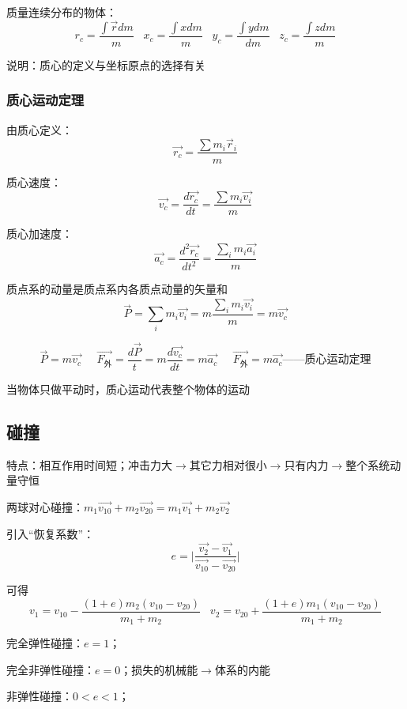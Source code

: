 \documentclass[UTF8]{article}
\begin{document}
    质量连续分布的物体：\[r_c = \frac{\int\vec{r}dm}{m}\;\;\;x_c = \frac{\int xdm}{m}\;\;\;y_c = \frac{\int ydm}{dm}\;\;\;z_c = \frac{\int zdm}{m}\]

    说明：质心的定义与坐标原点的选择有关

\subsubsection{质心运动定理}

    由质心定义：\[\vec{r_c} = \frac{\sum m_i\vec r_i}{m}\]
    
    质心速度：\[\vec{v_c} = \frac{d\vec{r_c}}{dt} = \frac{\sum m_i\vec{v_i}}{m}\]

    质心加速度：\[\vec{a_c} = \frac{d^2\vec{r_c}}{dt^2} = \frac{\sum_i m_i\vec{a_i}}{m}\]

    质点系的动量是质点系内各质点动量的矢量和
    \[\vec{P} = \sum_i m_i\vec{v_i} = m\frac{\sum_i m_i\vec{v_i}}{m} = m\vec{v_c}\]

    \[\vec{P} = m\vec{v_c}\;\;\;\;\;\vec{F_{\mbox{外}}} = \frac{d\vec{P}}{t} = m\frac{d\vec{v_c}}{dt} = m\vec{a_c}\;\;\;\;\;\vec{F_{\mbox{外}}} = m\vec{a_c}\mbox{——质心运动定理}\]

    当物体只做平动时，质心运动代表整个物体的运动

\subsection{碰撞}

    特点：相互作用时间短；冲击力大$\rightarrow$其它力相对很小$\rightarrow$只有内力$\rightarrow$整个系统动量守恒

    两球对心碰撞：$m_1\vec{v_{10}} + m_2\vec{v_{20}} = m_1\vec{v_1} + m_2\vec{v_2}$

    引入“恢复系数”：\[e = \lvert \frac{\vec{v_2} - \vec{v_1}}{\vec{v_{10}} - \vec{v_{20}}} \rvert\]

    可得\[v_1 = v_{10} - \frac{(1+e)m_2(v_{10} - v_{20})}{m_1 + m_2}\;\;\;v_2 = v_{20} + \frac{(1+e)m_1(v_{10} - v_{20})}{m_1 + m_2}\]

    完全弹性碰撞：$e = 1$；

    完全非弹性碰撞：$e = 0$；损失的机械能$\rightarrow$体系的内能

    非弹性碰撞：$0<e<1$；

\newpage
\end{document}

